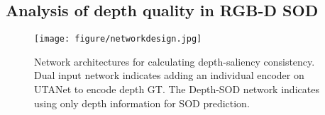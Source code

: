 \documentclass[journal]{IEEEtran}
\begin{document}
\subsection{Analysis of depth quality in RGB-D SOD}

\begin{figure}[t]
	\begin{center}
\texttt{[image: figure/networkdesign.jpg]}
		\caption{ Network architectures for calculating depth-saliency consistency. Dual input network indicates adding an individual encoder on UTANet to encode depth GT. The Depth-SOD network indicates using only depth information for SOD prediction.
		}\label{fig:qualitynetwork}
	\end{center}
\end{figure}
\end{document}

